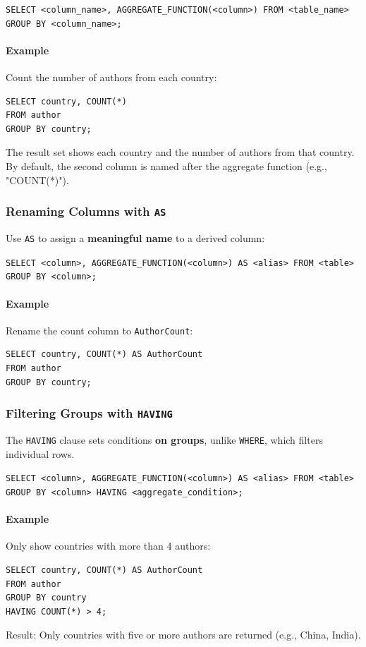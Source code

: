 \documentclass{article}
\begin{document}
\begin{FormulaBox}
\texttt{SELECT <column\_name>, AGGREGATE\_FUNCTION(<column>) 
FROM <table\_name> 
GROUP BY <column\_name>;}
\end{FormulaBox}

\paragraph{Example}
Count the number of authors from each country:
\begin{verbatim}
SELECT country, COUNT(*)
FROM author
GROUP BY country;
\end{verbatim}
The result set shows each country and the number of authors from that country.  
By default, the second column is named after the aggregate function (e.g., "COUNT(*)").  

\subsubsection{Renaming Columns with \texttt{AS}}
Use \texttt{AS} to assign a \textbf{meaningful name} to a derived column:

\begin{FormulaBox}
\texttt{SELECT <column>, AGGREGATE\_FUNCTION(<column>) AS <alias>
FROM <table>
GROUP BY <column>;}
\end{FormulaBox}

\paragraph{Example}
Rename the count column to \texttt{AuthorCount}:
\begin{verbatim}
SELECT country, COUNT(*) AS AuthorCount
FROM author
GROUP BY country;
\end{verbatim}

\subsubsection{Filtering Groups with \texttt{HAVING}}
The \texttt{HAVING} clause sets conditions \textbf{on groups}, unlike \texttt{WHERE}, which filters individual rows.  

\begin{FormulaBox}
\texttt{SELECT <column>, AGGREGATE\_FUNCTION(<column>) AS <alias>
FROM <table>
GROUP BY <column>
HAVING <aggregate\_condition>;}
\end{FormulaBox}

\paragraph{Example}
Only show countries with more than 4 authors:
\begin{verbatim}
SELECT country, COUNT(*) AS AuthorCount
FROM author
GROUP BY country
HAVING COUNT(*) > 4;
\end{verbatim}
Result: Only countries with five or more authors are returned (e.g., China, India).
\end{document}

